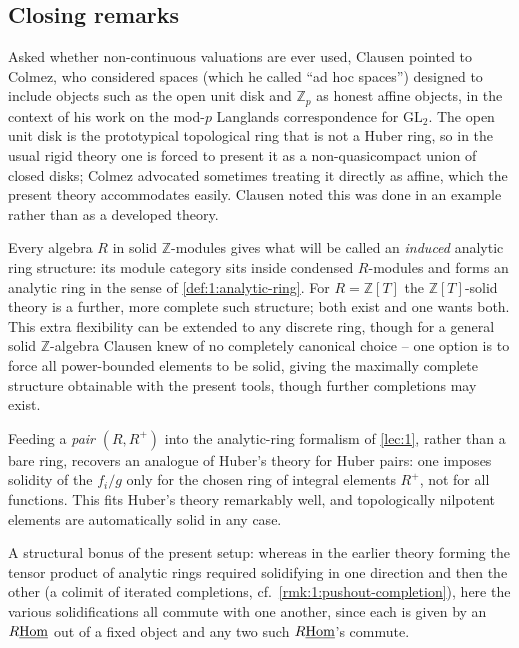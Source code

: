 \subsection{Closing remarks}

\begin{remark}
\label{rmk:7:colmez}
Asked whether non-continuous valuations are ever used, Clausen pointed to
Colmez, who considered spaces (which he called ``ad hoc spaces'') designed to
include objects such as the open unit disk and $\mathbb{Z}_p$ as honest affine
objects, in the context of his work on the mod-$p$ Langlands correspondence for
$\mathrm{GL}_2$. The open unit disk is the prototypical topological ring that is
not a Huber ring, so in the usual rigid theory one is forced to present it as a
non-quasicompact union of closed disks; Colmez advocated sometimes treating it
directly as affine, which the present theory accommodates easily. Clausen noted
this was done in an example rather than as a developed theory.
\end{remark}

\begin{remark}
\label{rmk:7:analytic-ring}
Every algebra $R$ in solid $\mathbb{Z}$-modules gives what will be called an
\emph{induced} analytic ring structure: its module category sits inside
condensed $R$-modules and forms an analytic ring in the sense of
\cref{def:1:analytic-ring}. For $R=\mathbb{Z}[T]$ the $\mathbb{Z}[T]$-solid
theory is a further, more complete such structure; both exist and one wants
both. This extra flexibility can be extended to any discrete ring, though for a
general solid $\mathbb{Z}$-algebra Clausen knew of no completely canonical
choice -- one option is to force all power-bounded elements to be solid, giving
the maximally complete structure obtainable with the present tools, though
further completions may exist.

Feeding a \emph{pair} $(R,R^{+})$ into the analytic-ring formalism of
\cref{lec:1}, rather than a bare ring, recovers an analogue of Huber's theory
for Huber pairs: one imposes solidity of the $f_i/g$ only for the chosen ring
of integral elements $R^{+}$, not for all functions. This fits Huber's theory
remarkably well, and topologically nilpotent elements are automatically solid
in any case.
\end{remark}

\begin{remark}
\label{rmk:7:solidifications-commute}
A structural bonus of the present setup: whereas in the earlier theory forming
the tensor product of analytic rings required solidifying in one direction and
then the other (a colimit of iterated completions, cf.\
\cref{rmk:1:pushout-completion}), here the various solidifications all commute
with one another, since each is given by an $R\underline{\operatorname{Hom}}$ out of a fixed object and
any two such $R\underline{\operatorname{Hom}}$'s commute.
\end{remark}

